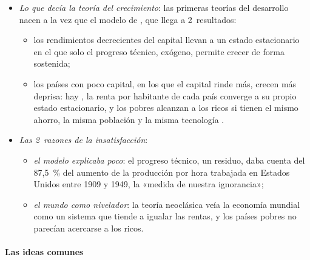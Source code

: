 \documentclass[11pt]{article}
\begin{document}
\begin{itemize}
\item \emph{Lo que decía la teoría del crecimiento}: las primeras teorías del desarrollo nacen a la vez que el modelo de \textcite{Solow1956} , que llega a 2~resultados:
  \begin{itemize}
  \item los rendimientos decrecientes del capital llevan a un estado estacionario en el que solo el progreso técnico, exógeno, permite crecer de forma sostenida;
  \item los países con poco capital, en los que el capital rinde más, crecen más deprisa: hay , la renta por habitante de cada país converge a su propio estado estacionario, y los pobres alcanzan a los ricos si tienen el mismo ahorro, la misma población y la misma tecnología .
  \end{itemize}
\item \emph{Las 2~razones de la insatisfacción}:
  \begin{itemize}
  \item \emph{el modelo explicaba poco}: el progreso técnico, un residuo, daba cuenta del 87,5~\% del aumento de la producción por hora trabajada en Estados Unidos entre 1909 y 1949\nocite{Solow1957}, la «medida de nuestra ignorancia»\nocite{Abramovitz1956};
  \item \emph{el mundo como nivelador}: la teoría neoclásica veía la economía mundial como un sistema que tiende a igualar las rentas, y los países pobres no parecían acercarse a los ricos.
  \end{itemize}
\end{itemize}

\paragraph{Las ideas comunes}\label{sec:ideas-comunes}
\end{document}
